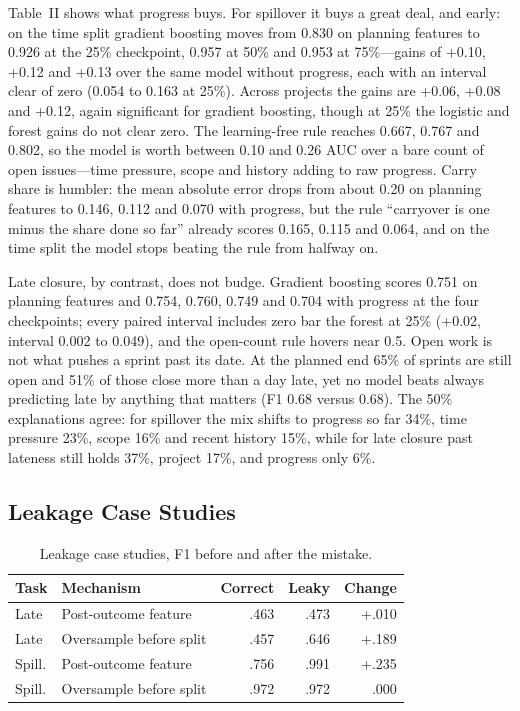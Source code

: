 \documentclass[conference]{IEEEtran}
\begin{document}
Table~II shows what progress buys. For spillover it buys a great deal, and early: on the time split gradient boosting moves from 0.830 on planning features to 0.926 at the 25\% checkpoint, 0.957 at 50\% and 0.953 at 75\%---gains of +0.10, +0.12 and +0.13 over the same model without progress, each with an interval clear of zero (0.054 to 0.163 at 25\%). Across projects the gains are +0.06, +0.08 and +0.12, again significant for gradient boosting, though at 25\% the logistic and forest gains do not clear zero. The learning-free rule reaches 0.667, 0.767 and 0.802, so the model is worth between 0.10 and 0.26 AUC over a bare count of open issues---time pressure, scope and history adding to raw progress. Carry share is humbler: the mean absolute error drops from about 0.20 on planning features to 0.146, 0.112 and 0.070 with progress, but the rule ``carryover is one minus the share done so far'' already scores 0.165, 0.115 and 0.064, and on the time split the model stops beating the rule from halfway on.

Late closure, by contrast, does not budge. Gradient boosting scores 0.751 on planning features and 0.754, 0.760, 0.749 and 0.704 with progress at the four checkpoints; every paired interval includes zero bar the forest at 25\% (+0.02, interval 0.002 to 0.049), and the open-count rule hovers near 0.5. Open work is not what pushes a sprint past its date. At the planned end 65\% of sprints are still open and 51\% of those close more than a day late, yet no model beats always predicting late by anything that matters (F1 0.68 versus 0.68). The 50\% explanations agree: for spillover the mix shifts to progress so far 34\%, time pressure 23\%, scope 16\% and recent history 15\%, while for late closure past lateness still holds 37\%, project 17\%, and progress only 6\%.

\subsection{Leakage Case Studies}

\begin{table}[!t]
\centering\scriptsize
\caption{Leakage case studies, F1 before and after the mistake.}
\label{tab:leak}
\setlength{\tabcolsep}{5pt}
\begin{tabular}{llrrr}
\hline
Task & Mechanism & Correct & Leaky & Change\\
\hline
Late & Post-outcome feature & .463 & .473 & +.010\\
Late & Oversample before split & .457 & .646 & +.189\\
Spill. & Post-outcome feature & .756 & .991 & +.235\\
Spill. & Oversample before split & .972 & .972 & .000\\
\hline
\end{tabular}
\end{table}
\end{document}
